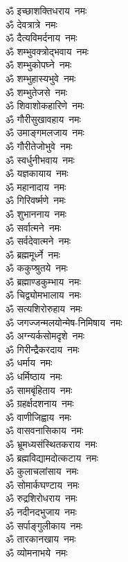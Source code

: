\begin{multicols}{2}
\begin{flushleft}
ॐ इच्छाशक्तिधराय~नमः\\
ॐ देवत्रात्रे~नमः\\
ॐ दैत्यविमर्दनाय~नमः\\
ॐ शम्भुवक्त्रोद्भवाय~नमः\hfill{}\\
ॐ शम्भुकोपघ्ने~नमः\\
ॐ शम्भुहास्यभुवे~नमः\\
ॐ शम्भुतेजसे~नमः\\
ॐ शिवाशोकहारिणे~नमः\\
ॐ गौरीसुखावहाय~नमः\\
ॐ उमाङ्गमलजाय~नमः\\
ॐ गौरीतेजोभुवे~नमः\\
ॐ स्वर्धुनीभवाय~नमः\\
ॐ यज्ञकायाय~नमः\\
ॐ महानादाय~नमः\hfill{}\\
ॐ गिरिवर्ष्मणे~नमः\\
ॐ शुभाननाय~नमः\\
ॐ सर्वात्मने~नमः\\
ॐ सर्वदेवात्मने~नमः\\
ॐ ब्रह्ममूर्ध्ने~नमः\\
ॐ ककुप्श्रुतये~नमः\\
ॐ ब्रह्माण्डकुम्भाय~नमः\\
ॐ चिद्व्योमभालाय~नमः\\
ॐ सत्यशिरोरुहाय~नमः\\
ॐ जगज्जन्मलयोन्मेष-निमिषाय~नमः\hfill{}\\
ॐ अग्न्यर्कसोमदृशे~नमः\\
ॐ गिरीन्द्रैकरदाय~नमः\\
ॐ धर्माय~नमः\\
ॐ धर्मिष्ठाय~नमः\\
ॐ सामबृंहिताय~नमः\\
ॐ ग्रहर्क्षदशनाय~नमः\\
ॐ वाणीजिह्वाय~नमः\\
ॐ वासवनासिकाय~नमः\\
ॐ भ्रूमध्यसंस्थितकराय~नमः\\
ॐ ब्रह्मविद्यामदोत्कटाय~नमः\hfill{}\\
ॐ कुलाचलांसाय~नमः\\
ॐ सोमार्कघण्टाय~नमः\\
ॐ रुद्रशिरोधराय~नमः\\
ॐ नदीनदभुजाय~नमः\\
ॐ सर्पाङ्गुलीकाय~नमः\\
ॐ तारकानखाय~नमः\\
ॐ व्योमनाभये~नमः\\

\end{flushleft}
\end{multicols}
